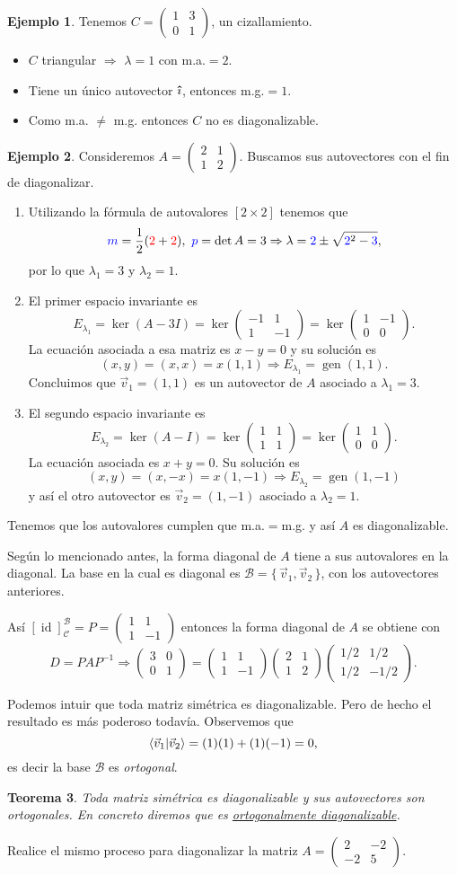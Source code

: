 \documentclass[12pt]{article}
\theoremstyle{plain}
\newtheorem{Th}{Teorema}  %
\theoremstyle{definition}
\newtheorem{Ex}[Th]{Ejemplo}           %
\theoremstyle{remark}
\DeclareMathOperator{\gen}{gen}     %
\DeclareMathOperator{\id}{id}       %
\newcommand{\la}{\lambda}           %
\newcommand{\ii}{\vu{\imath}}
\newcommand{\cB}{\mathcal{B}}       %
\newcommand{\cC}{\mathcal{C}}       %
\newcommand{\x}{\times}             %
\renewcommand{\:}{\colon}           %
\newcommand{\un}[1]{\underline{#1}}
\renewcommand{\.}{\Cdot}                %
\newcommand{\twobytwo}[4]{\begin{pmatrix} %
    #1 & #2 \\ #3 & #4 \end{pmatrix}}
\newcommand{\To}{\Rightarrow}
\newcommand{\set}[1]{\{\,#1\,\}}    %
\newcommand{\red}[1]{\textcolor{red}{#1}}
\newcommand{\blu}[1]{\textcolor{blue}{#1}}
\begin{document}
\begin{multicols}{2}
\begin{Ex} 
Tenemos $C=\twobytwo{1}{3}{0}{1}$, un cizallamiento. 
\begin{itemize}
  \itemsep=-0.5em
  \item $C$ triangular $\To$ $\la=1$ con m.a.$=2$.
  \item Tiene un único autovector $\ii$, entonces m.g.$=1$.
  \item Como m.a. $\neq$ m.g. entonces $C$ no es diagonalizable.
\end{itemize}
\end{Ex}

\begin{Ex}
  Consideremos $A=\twobytwo{2}{1}{1}{2}$. Buscamos sus autovectores con el fin de diagonalizar.
  \begin{enumerate}
    \itemsep=-0.5em
    \item Utilizando la fórmula de autovalores $[2\x 2]$ tenemos que 
    $$\blu{m}=\frac{1}{2}(\red{2}+\red{2}),\ \blu{p}=\det A=3\To \la=\blu{2}\pm\sqrt{\blu{2}^2-\blu{3}},$$
    por lo que $\la_1=3$ y $\la_2=1$.
    \item El primer espacio invariante es 
    $$E_{\la_1}=\ker(A-3I)=\ker\twobytwo{-1}{1}{1}{-1}=\ker\twobytwo{1}{-1}{0}{0}.$$
    La ecuación asociada a esa matriz es $x-y=0$ y su solución es 
    $$(x,y)=(x,x)=x(1,1)\To E_{\la_1}=\gen(1,1).$$
    Concluimos que $\vec{v}_1=(1,1)$ es un autovector de $A$ asociado a $\la_1=3$.
    \item El segundo espacio invariante es 
    $$E_{\la_2}=\ker(A-I)=\ker\twobytwo{1}{1}{1}{1}=\ker\twobytwo{1}{1}{0}{0}.$$
    La ecuación asociada es $x+y=0$. Su solución es 
    $$(x,y)=(x,-x)=x(1,-1)\To E_{\la_2}=\gen(1,-1)$$
    y así el otro autovector es $\vec{v}_2=(1,-1)$ asociado a $\la_2=1$.
  \end{enumerate}
  Tenemos que los autovalores cumplen que m.a.$=$m.g. y así $A$ es diagonalizable.\par 
  Según lo mencionado antes, la forma diagonal de $A$ tiene a sus autovalores en la diagonal. La base en la cual es diagonal es $\cB=\set{\vec{v}_1,\vec{v}_2}$, con los autovectores anteriores.\par 
  Así $[\id]^\cB_\cC=P=\twobytwo{1}{1}{1}{-1}$ entonces la forma diagonal de $A$ se obtiene con 
  $$D=PAP^{-1}\To\twobytwo{3}{0}{0}{1}=\twobytwo{1}{1}{1}{-1}\twobytwo{2}{1}{1}{2}\twobytwo{1/2}{1/2}{1/2}{-1/2}.$$
\end{Ex}

Podemos intuir que toda matriz simétrica es diagonalizable. Pero de hecho el resultado es más poderoso todavía. Observemos que 
$$\braket{\vec{v}_1}{\vec{v}_2}=(1)(1)+(1)(-1)=0,$$
es decir la base $\cB$ es \emph{ortogonal}.

\begin{Th}
  Toda matriz simétrica es diagonalizable y sus autovectores son ortogonales. En concreto diremos que es \un{ortogonalmente diagonalizable}.
\end{Th}
\begin{ptcbP}
Realice el mismo proceso para diagonalizar la matriz $A=\twobytwo{2}{-2}{-2}{5}$.
\end{ptcbP}
\end{multicols}
\end{document}
